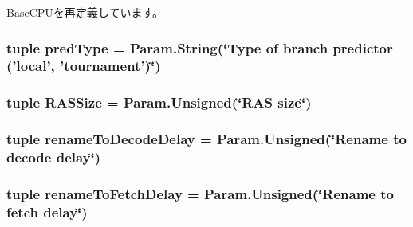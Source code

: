 \hyperlink{classBaseCPU_aac03a586f9fcb28bcbe8c3721888fa93}{BaseCPU}を再定義しています。\hypertarget{classOzoneCPU_1_1DerivOzoneCPU_a21f1c740ec019f8327179a37b26cc7a3}{
\subsubsection[{predType}]{\setlength{\rightskip}{0pt plus 5cm}tuple {\bf predType} = Param.String(\char`\"{}Type of branch predictor ('local', 'tournament')\char`\"{})}}
\label{classOzoneCPU_1_1DerivOzoneCPU_a21f1c740ec019f8327179a37b26cc7a3}
\hypertarget{classOzoneCPU_1_1DerivOzoneCPU_ad32cfe43a618dca49f7aba3c597df196}{
\subsubsection[{RASSize}]{\setlength{\rightskip}{0pt plus 5cm}tuple {\bf RASSize} = Param.Unsigned(\char`\"{}RAS size\char`\"{})}}
\label{classOzoneCPU_1_1DerivOzoneCPU_ad32cfe43a618dca49f7aba3c597df196}
\hypertarget{classOzoneCPU_1_1DerivOzoneCPU_a4cd25aa163add4667be26df636d1d72d}{
\subsubsection[{renameToDecodeDelay}]{\setlength{\rightskip}{0pt plus 5cm}tuple {\bf renameToDecodeDelay} = Param.Unsigned(\char`\"{}Rename to decode delay\char`\"{})}}
\label{classOzoneCPU_1_1DerivOzoneCPU_a4cd25aa163add4667be26df636d1d72d}
\hypertarget{classOzoneCPU_1_1DerivOzoneCPU_a8aaf587e0c65d740c68328f587f36b97}{
\subsubsection[{renameToFetchDelay}]{\setlength{\rightskip}{0pt plus 5cm}tuple {\bf renameToFetchDelay} = Param.Unsigned(\char`\"{}Rename to fetch delay\char`\"{})}}

